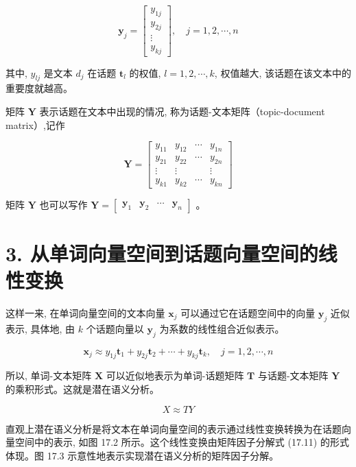 \documentclass[10pt]{article}
\begin{document}
\[
\boldsymbol{y}_{j}=\left[\begin{array}{c}
y_{1 j}  \tag{17.8}\\
y_{2 j} \\
\vdots \\
y_{k j}
\end{array}\right], \quad j=1,2, \cdots, n
\]

其中, $y_{l j}$ 是文本 $d_{j}$ 在话题 $\boldsymbol{t}_{l}$ 的权值, $l=1,2, \cdots, k$, 权值越大, 该话题在该文本中的重要度就越高。

矩阵 $\boldsymbol{Y}$ 表示话题在文本中出现的情况, 称为话题-文本矩阵（topic-document matrix）,记作

\[
\boldsymbol{Y}=\left[\begin{array}{cccc}
y_{11} & y_{12} & \cdots & y_{1 n}  \tag{17.9}\\
y_{21} & y_{22} & \cdots & y_{2 n} \\
\vdots & \vdots & & \vdots \\
y_{k 1} & y_{k 2} & \cdots & y_{k n}
\end{array}\right]
\]

矩阵 $\boldsymbol{Y}$ 也可以写作 $\boldsymbol{Y}=\left[\begin{array}{llll}\boldsymbol{y}_{1} & \boldsymbol{y}_{2} & \cdots & \boldsymbol{y}_{n}\end{array}\right]$ 。

\section*{3. 从单词向量空间到话题向量空间的线性变换}
这样一来, 在单词向量空间的文本向量 $\boldsymbol{x}_{j}$ 可以通过它在话题空间中的向量 $\boldsymbol{y}_{j}$ 近似表示, 具体地, 由 $k$ 个话题向量以 $\boldsymbol{y}_{j}$ 为系数的线性组合近似表示。


\begin{equation*}
\boldsymbol{x}_{j} \approx y_{1 j} \boldsymbol{t}_{1}+y_{2 j} \boldsymbol{t}_{2}+\cdots+y_{k j} \boldsymbol{t}_{k}, \quad j=1,2, \cdots, n \tag{17.10}
\end{equation*}


所以, 单词-文本矩阵 $\boldsymbol{X}$ 可以近似地表示为单词-话题矩阵 $\boldsymbol{T}$ 与话题-文本矩阵 $\boldsymbol{Y}$ 的乘积形式。这就是潜在语义分析。


\begin{equation*}
X \approx T Y \tag{17.11}
\end{equation*}


直观上潜在语义分析是将文本在单词向量空间的表示通过线性变换转换为在话题向量空间中的表示, 如图 17.2 所示。这个线性变换由矩阵因子分解式 (17.11) 的形式体现。图 17.3 示意性地表示实现潜在语义分析的矩阵因子分解。
\end{document}
